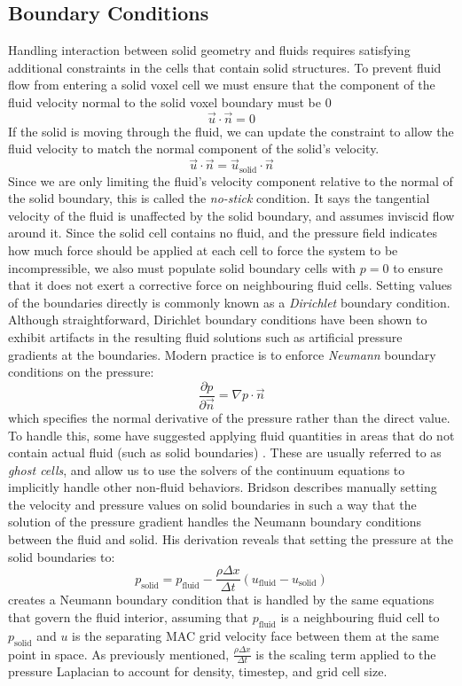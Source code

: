 \documentclass[a4paper, 11pt, titlepage]{article}
\renewcommand\i[1]{\textit{#1}}%
\begin{document}
\subsection{Boundary Conditions}
Handling interaction between solid geometry and fluids requires satisfying
additional constraints in the cells that contain solid structures. To prevent
fluid flow from entering a solid voxel cell we must ensure that the component of
the fluid velocity normal to the solid voxel boundary must be 0
$$
    \vec{u} \cdot \vec{n} = 0
$$
If the solid is moving through the fluid, we can update the
constraint to allow the fluid velocity to match the normal component of the
solid's velocity.
$$
    \vec{u} \cdot \vec{n} = \vec{u}_\text{solid} \cdot \vec{n}
$$
Since we are only limiting the fluid's velocity component relative to the
normal of the solid boundary, this is called the \i{no-stick} condition. It says
the tangential velocity of the fluid is unaffected by the solid boundary, and
assumes inviscid flow around it. Since the solid cell contains no fluid, and
the pressure field indicates how much force should be applied at each cell to
force the system to be incompressible, we also must populate solid boundary cells with
$p = 0$ to ensure that it does not exert a corrective force on neighbouring
fluid cells. Setting values of the boundaries directly is commonly known
as a \i{Dirichlet} boundary condition. Although straightforward, Dirichlet
boundary conditions have been shown to exhibit artifacts in the resulting fluid
solutions such as artificial pressure gradients at the boundaries. Modern
practice is to enforce \i{Neumann} boundary conditions on the pressure:
$$
\frac{\partial p}{\partial \vec{n}} = \nabla p \cdot \vec{n}
$$
which specifies the normal derivative of the pressure rather than the direct
value. To handle this, some have
suggested applying fluid quantities in areas that do not contain actual fluid
(such as solid boundaries) \cite{bridsonbook,fedkiw1999non}. These are usually referred to
as \i{ghost cells}, and allow us to use the solvers of the continuum equations
to implicitly handle other non-fluid behaviors. Bridson describes manually
setting the velocity and pressure values on solid boundaries in such a way that
the solution of the pressure gradient handles the Neumann boundary conditions
between the fluid and solid. His derivation reveals that setting the pressure at
the solid boundaries to:
$$
    p_\text{solid} = p_\text{fluid} - \frac{\rho \Delta x}{\Delta t}(u_\text{fluid} - u_\text{solid})
$$
creates a Neumann boundary condition that is handled by the same equations that
govern the fluid interior, assuming that $p_\text{fluid}$ is a neighbouring
fluid cell to $p_\text{solid}$ and $u$ is the separating MAC grid velocity face between them at the same
point in space. As previously mentioned, $\frac{\rho \Delta x}{\Delta t}$ is the scaling term applied to
the pressure Laplacian to account for density, timestep, and grid cell size.
\end{document}
